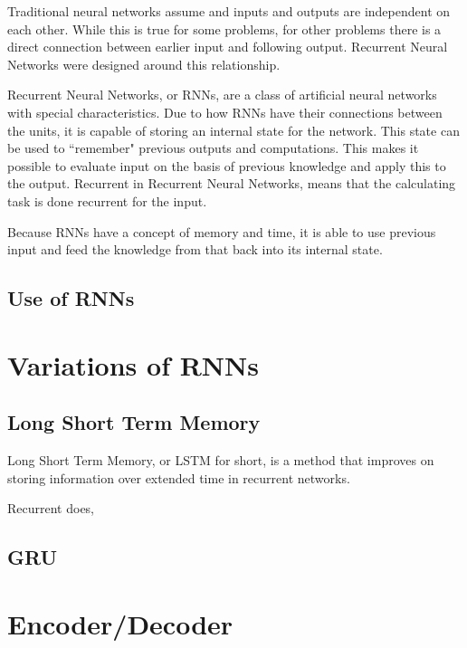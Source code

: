 Traditional neural networks assume and inputs and outputs are independent on each other. While this is true for some problems, for other problems there is a direct connection between earlier input and following output. Recurrent Neural Networks were designed around this relationship.

Recurrent Neural Networks, or RNNs, are a class of artificial neural networks with special characteristics. Due to how RNNs have their connections between the units, it is capable of storing an internal state for the network. This state can be used to ``remember" previous outputs and computations. This makes it possible to evaluate input on the basis of previous knowledge and apply this to the output. Recurrent in Recurrent Neural Networks, means that the calculating task is done recurrent for the input.


Because RNNs have a concept of memory and time, it is able to use previous input and feed the knowledge from that back into its internal state. 

\subsection{Use of RNNs}


\section{Variations of RNNs}

\subsection{Long Short Term Memory}
Long Short Term Memory, or LSTM for short, is a method that improves on storing information over extended time in recurrent networks. 

Recurrent does, 

\cite{hochreiter1997long}

\subsection{GRU}


\section{Encoder/Decoder}

\cite{rocktaschel2015reasoning}
\fi
